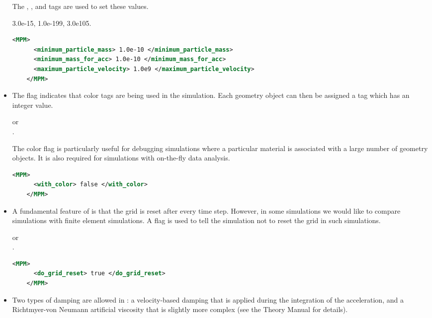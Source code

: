 \begin{itemize}
    The , , and
     tags are used to set these values.

     3.0e-15, 1.0e-199, 3.0e105.
    \begin{lstlisting}[language=XML]
    <MPM>
      <minimum_particle_mass> 1.0e-10 </minimum_particle_mass>
      <minimum_mass_for_acc> 1.0e-10 </minimum_mass_for_acc>
      <maximum_particle_velocity> 1.0e9 </maximum_particle_velocity>
    </MPM>
    \end{lstlisting}

  \item {}  The  flag indicates that
    color tags are being used in the simulation.  Each geometry object can 
    then be assigned a  tag which has 
    an integer value.

      or \\
     .

    The color flag is particularly useful for debugging simulations where a
    particular material is associated with a large number of geometry objects.
    It is also required for simulations with on-the-fly data analysis.
    \begin{lstlisting}[language=XML]
    <MPM>
      <with_color> false </with_color>
    </MPM>
    \end{lstlisting}

  \item {} A fundamental feature of \MPM is that the grid is reset
    after every time step.  However, in some simulations we would like to compare
    \Vaango simulations with finite element simulations.  A 
    flag is used to tell the simulation not to reset the grid in such simulations.

      or \\
     .
    \begin{lstlisting}[language=XML]
    <MPM>
      <do_grid_reset> true </do_grid_reset>
    </MPM>
    \end{lstlisting}

  \item {}  Two types of damping are allowed in \Vaango : a
    velocity-based damping that is applied during the integration of the
    acceleration, and a Richtmyer-von Neumann artificial viscosity that
    is slightly more complex (see the Theory Manual for details).


\end{itemize}

